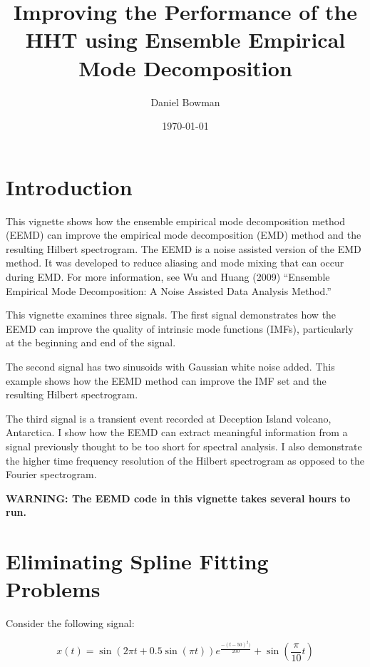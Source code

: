 \documentclass[12pt]{article}
\begin{document}
\title{Improving the Performance of the HHT using Ensemble Empirical Mode Decomposition}
\author{Daniel Bowman}
\date{\today}
\maketitle
\tableofcontents

\section{Introduction}


This vignette shows how the ensemble empirical mode decomposition method (EEMD) can improve the empirical mode decomposition (EMD) method and the resulting Hilbert spectrogram.
The EEMD is a noise assisted version of the EMD method.
It was developed to reduce aliasing and mode mixing that can occur during EMD.
For more information, see Wu and Huang (2009) ``Ensemble Empirical Mode Decomposition: A Noise Assisted Data Analysis Method.''

This vignette examines three signals.
The first signal demonstrates how the EEMD can improve the quality of intrinsic mode functions (IMFs), particularly at the beginning and end of the signal.

The second signal has two sinusoids with Gaussian white noise added.
This example shows how the EEMD method can improve the IMF set and the resulting Hilbert spectrogram.

The third signal is a transient event recorded at Deception Island volcano, Antarctica.
I show how the EEMD can extract meaningful information from a signal previously thought to be too short for spectral analysis.
I also demonstrate the higher time frequency resolution of the Hilbert spectrogram as opposed to the Fourier spectrogram.

\textbf{WARNING:  The EEMD code in this vignette takes several hours to run.}

\section{Eliminating Spline Fitting Problems}

Consider the following signal:

\begin{equation}
\label{eqn:nonlinsta}
x (t) = \sin(2\pi t+0.5\sin(\pi t))e^{\frac{-(t-50)^{2})}{200}} + \sin(\frac{\pi}{10} t)
\end{equation}
\end{document}
